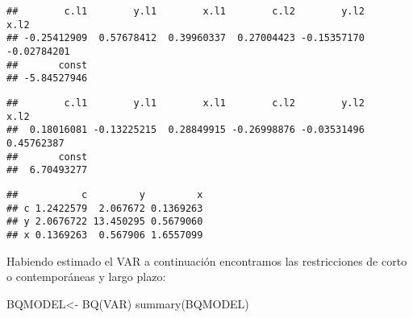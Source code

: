 \documentclass[
]{book}
\newenvironment{Shaded}{\begin{snugshade}}{\end{snugshade}}
\newcommand{\FunctionTok}[1]{\textcolor[rgb]{0.00,0.00,0.00}{#1}}
\newcommand{\NormalTok}[1]{#1}
\newcommand{\OtherTok}[1]{\textcolor[rgb]{0.56,0.35,0.01}{#1}}
\newcommand{\SpecialCharTok}[1]{\textcolor[rgb]{0.00,0.00,0.00}{#1}}
\begin{document}
\begin{Shaded}
\end{Shaded}

\begin{verbatim}
##        c.l1        y.l1        x.l1        c.l2        y.l2        x.l2 
## -0.25412909  0.57678412  0.39960337  0.27004423 -0.15357170 -0.02784201 
##       const 
## -5.84527946
\end{verbatim}

\begin{Shaded}
\end{Shaded}

\begin{verbatim}
##        c.l1        y.l1        x.l1        c.l2        y.l2        x.l2 
##  0.18016081 -0.13225215  0.28849915 -0.26998876 -0.03531496  0.45762387 
##       const 
##  6.70493277
\end{verbatim}

\begin{Shaded}
\end{Shaded}

\begin{verbatim}
##           c         y         x
## c 1.2422579  2.067672 0.1369263
## y 2.0676722 13.450295 0.5679060
## x 0.1369263  0.567906 1.6557099
\end{verbatim}

Habiendo estimado el VAR a continuación encontramos las restricciones de corto o contemporáneas y largo plazo:

\begin{Shaded}
\begin{Highlighting}[]
\NormalTok{BQMODEL}\OtherTok{\textless{}{-}} \FunctionTok{BQ}\NormalTok{(VAR)}
\FunctionTok{summary}\NormalTok{(BQMODEL)}
\end{Highlighting}
\end{Shaded}
\end{document}
